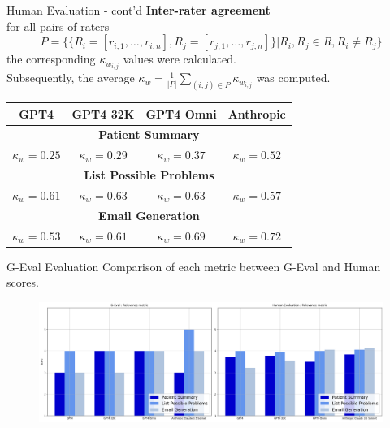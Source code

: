 \documentclass[usenames,dvipsnames]{beamer}
\begin{document}
\begin{frame}{Human Evaluation - cont'd}
  \textbf{Inter-rater agreement}\\
  for all pairs of raters 
  \[
  P=\{\{R_i= [r_{i,1}, \ldots, r_{i,n}],R_j = [r_{j,1},\ldots,r_{j,n}]\}|R_i,R_j\in R, R_i\neq R_j\}
  \]
  the corresponding $\kappa_{w_{i,j}}$ values were calculated.\\
  Subsequently, the average $\kappa_w = \frac{1}{|P|}\sum_{(i,j)\in P} \kappa_{w_{i,j}}$ was computed.
  \vspace{5mm}
  {\tiny
  \begin{table}[b]
    \centering
    \setlength{\extrarowheight}{2pt}
    \begin{tabular}{|c|c|c|c|}
    \hline
    GPT4 & GPT4 32K & GPT4 Omni & Anthropic\\
    \hline
    \multicolumn{4}{|c|}{\textbf{Patient Summary}} \\
    \hline
    $\kappa_w=0.25$ & $\kappa_w=0.29$ & $\kappa_w=0.37$ & $\kappa_w=0.52$ \\
    \hline
    \multicolumn{4}{|c|}{\textbf{List Possible Problems}} \\
    \hline
    $\kappa_w=0.61$ & $\kappa_w=0.63$ & $\kappa_w=0.63$ & $\kappa_w=0.57$ \\
    \hline
    \multicolumn{4}{|c|}{\textbf{Email Generation}} \\
    \hline
    $\kappa_w=0.53$ & $\kappa_w=0.61$ & $\kappa_w=0.69$ & $\kappa_w=0.72$ \\
    \hline
    \end{tabular}
  \end{table}
  }
\end{frame}

\begin{frame}{G-Eval Evaluation}
  \centering
  Comparison of each metric between G-Eval and Human scores.
  \vspace{5mm}
  \begin{figure}[b]
    \includegraphics[width=\textwidth]{images/comparison.png}
  \end{figure}  
\end{frame}
\end{document}
